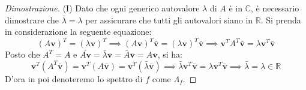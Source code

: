 \documentclass{article}
\begin{document}
    \begin{proof}[Dimostrazione]
        (I) Dato che ogni generico autovalore $\lambda$ di $A$ è in $\mathbb{C}$, è necessario dimostrare che $\bar{\lambda} = \lambda$ per assicurare che tutti gli autovalori siano in $\mathbb{R}$. 
        Si prenda in considerazione la seguente equazione:
        \[
            (A \mathbf{v})^{T} = (\lambda \mathbf{v})^{T} \implies (A \mathbf{v})^{T} \bar{\mathbf{v}} = (\lambda \mathbf{v})^{T} \bar{\mathbf{v}} \implies \mathbf{v}^{T} A^{T} \bar{\mathbf{v}} = \lambda \mathbf{v}^{T} \bar{\mathbf{v}} \tag{1.1}
        \]
        Posto che $A^{T} = A$ e $\overline{A \mathbf{v}} = \bar{\lambda} \bar{\mathbf{v}} = \bar{A} \bar{\mathbf{v}} = A \bar{\mathbf{v}}$, si ha:
        \[
            \mathbf{v}^{T} (A^{T} \bar{\mathbf{v}}) = \mathbf{v}^{T} (A \bar{\mathbf{v}}) = \mathbf{v}^{T} (\bar{\lambda} \bar{\mathbf{v}}) \implies \bar{\lambda} \mathbf{v}^{T} \bar{\mathbf{v}} = \lambda \mathbf{v}^{T} \bar{\mathbf{v}} \implies \bar{\lambda} = \lambda \in \mathbb{R} \tag{1.2}
        \]
        D'ora in poi denoteremo lo spettro di $f$ come $\Lambda_{f}$.


\end{proof}
\end{document}

